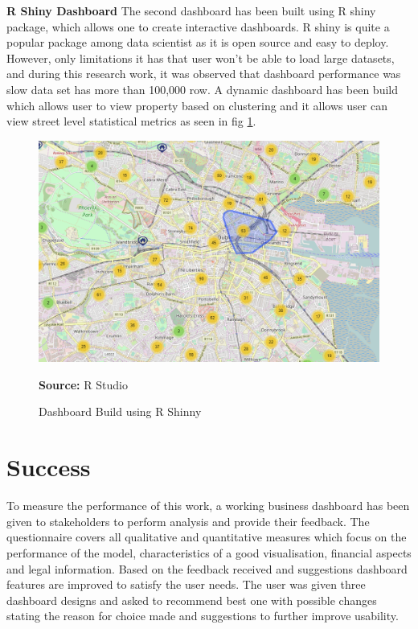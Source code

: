 \textbf{R Shiny Dashboard}
The second dashboard has been built using R shiny package, which allows one to create interactive dashboards. R shiny is quite a popular package among data scientist as it is open source and easy to deploy. However, only limitations it has that user won't be able to load large datasets, and during this research work, it was observed that dashboard performance was slow data set has more than 100,000 row. A dynamic dashboard has been build which allows user to view property based on clustering and it allows user can view street level statistical metrics as seen in fig \ref{fig:rmap}.

\begin{center}
\begin{figure}[!htb]
\includegraphics[width=\textwidth]{rmap.png}
\centering
\caption{Dashboard Build using R Shinny}{\textbf{Source:} R Studio}
\label{fig:rmap}
\end{figure}
\end{center}



\section{Success}\label{S.succes}
To measure the performance of this work, a working business dashboard has been given to stakeholders to perform analysis and provide their feedback. The questionnaire covers all qualitative and quantitative measures which focus on the performance of the model, characteristics of a good visualisation, financial aspects and legal information. Based on the feedback received and suggestions dashboard features are improved to satisfy the user needs. The user was given three dashboard designs and asked to recommend best one with possible changes stating the reason for choice made and suggestions to further improve usability.\\

